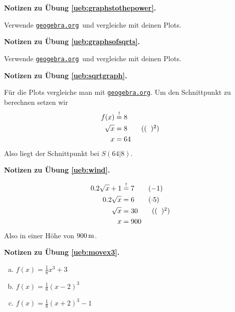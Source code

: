 \documentclass[%
11pt,%
twoside,%
titlepage,%
german,%
headsepline%
]{scrartcl}
\newcommand{\geogebralink}{\href{https://www.geogebra.org/calculator}{\texttt{geogebra.org}}}
\newcommand{\concatueb}[1]{ueb:#1}%
\newcommand{\concatlsg}[1]{lsg:#1}%
\newenvironment{lsg}[1]{%
    \par\noindent\textbf{Notizen zu Übung \ref{\concatueb{#1}}.}%
    \label{\concatlsg{#1}}
}{%
    \par%
}
\begin{document}
\begin{lsg}{graphstothepower}
  Verwende \geogebralink\   und vergleiche mit deinen Plots.
\end{lsg}

\begin{lsg}{graphsofsqrts}
  Verwende \geogebralink\   und vergleiche mit deinen Plots.
\end{lsg}

\begin{lsg}{sqrtgraph}
  Für die Plots vergleiche man mit \geogebralink . Um den Schnittpunkt zu berechnen setzen wir
  \begin{align*}
    f(x) &\stackrel{!}{=} 8\\
    \sqrt{x} &= 8\tag{$(\phantom{x})^2$}\\
    x &= 64
  \end{align*}
  Also liegt der Schnittpunkt bei $S(64|8)$.
\end{lsg}

\begin{lsg}{wind}
  \begin{align*}
    0.2\sqrt{x}+1 &\stackrel{!}{=} 7\tag{$-1$}\\
    0.2\sqrt{x} &= 6\tag{$\cdot5$}\\
    \sqrt{x} &= 30\tag{$(\phantom{x})^2$}\\
    x &= 900
  \end{align*}
  Also in einer Höhe von $\unit[900]{m}$.
\end{lsg}

\begin{lsg}{movex3}
  \begin{enumerate}[a)]
    \item $f(x)=\frac{1}{8}x^3+3$
    \item $f(x)=\frac{1}{8}(x-2)^3$
    \item $f(x)=\frac{1}{8}(x+2)^3-1$
  \end{enumerate}
\end{lsg}
\end{document}
